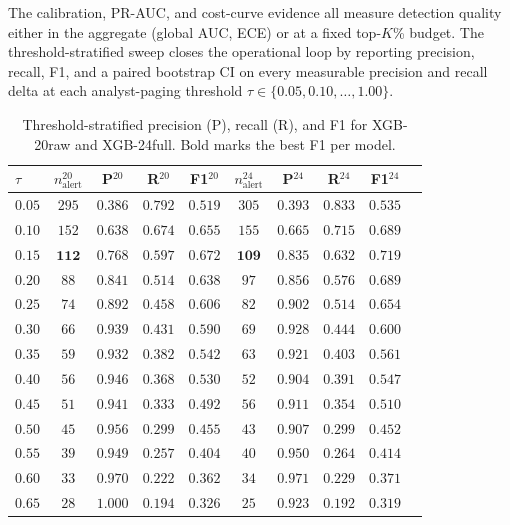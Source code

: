 \documentclass{article}
\begin{document}
The calibration, PR-AUC, and cost-curve evidence all measure detection
quality either in the aggregate (global AUC, ECE) or at a fixed
top-$K$\% budget. The threshold-stratified sweep closes the
operational loop by reporting precision, recall, F1, and a paired
bootstrap CI on every measurable precision and recall delta at each
analyst-paging threshold $\tau \in \{0.05, 0.10, \dots, 1.00\}$.

\begin{table}[t]
\centering
\small
\caption{Threshold-stratified precision (P), recall (R), and F1 for
XGB-20raw and XGB-24full. Bold marks the best F1 per model.}
\label{tab:p8-evidence-threshold-f1}
\begin{tabular}{lccccccccc}
\toprule
$\tau$ & $n_\text{alert}^\text{20}$ & P$^\text{20}$ & R$^\text{20}$ & F1$^\text{20}$ &
$n_\text{alert}^\text{24}$ & P$^\text{24}$ & R$^\text{24}$ & F1$^\text{24}$ \\
\midrule
$0.05$ & $295$ & $0.386$ & $0.792$ & $0.519$ & $305$ & $0.393$ & $0.833$ & $0.535$ \\
$0.10$ & $152$ & $0.638$ & $0.674$ & $0.655$ & $155$ & $0.665$ & $0.715$ & $0.689$ \\
$\mathbf{0.15}$ & $\mathbf{112}$ & $\mathbf{0.768}$ & $\mathbf{0.597}$ & $\mathbf{0.672}$ &
$\mathbf{109}$ & $\mathbf{0.835}$ & $\mathbf{0.632}$ & $\mathbf{0.719}$ \\
$0.20$ & $88$ & $0.841$ & $0.514$ & $0.638$ & $97$ & $0.856$ & $0.576$ & $0.689$ \\
$0.25$ & $74$ & $0.892$ & $0.458$ & $0.606$ & $82$ & $0.902$ & $0.514$ & $0.654$ \\
$0.30$ & $66$ & $0.939$ & $0.431$ & $0.590$ & $69$ & $0.928$ & $0.444$ & $0.600$ \\
$0.35$ & $59$ & $0.932$ & $0.382$ & $0.542$ & $63$ & $0.921$ & $0.403$ & $0.561$ \\
$0.40$ & $56$ & $0.946$ & $0.368$ & $0.530$ & $52$ & $0.904$ & $0.391$ & $0.547$ \\
$0.45$ & $51$ & $0.941$ & $0.333$ & $0.492$ & $56$ & $0.911$ & $0.354$ & $0.510$ \\
$0.50$ & $45$ & $0.956$ & $0.299$ & $0.455$ & $43$ & $0.907$ & $0.299$ & $0.452$ \\
$0.55$ & $39$ & $0.949$ & $0.257$ & $0.404$ & $40$ & $0.950$ & $0.264$ & $0.414$ \\
$0.60$ & $33$ & $0.970$ & $0.222$ & $0.362$ & $34$ & $0.971$ & $0.229$ & $0.371$ \\
$0.65$ & $28$ & $1.000$ & $0.194$ & $0.326$ & $25$ & $0.923$ & $0.192$ & $0.319$ \\

\end{tabular}
\end{table}
\end{document}
